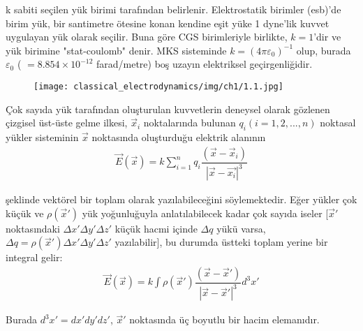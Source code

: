 k sabiti seçilen yük birimi tarafından belirlenir. Elektrostatik birimler (esb)'de birim yük, bir santimetre ötesine konan kendine eşit yüke 1 dyne'lik kuvvet uygulayan yük olarak seçilir. Buna göre CGS birimleriyle birlikte, $k = 1$'dir ve yük birimine "stat-coulomb" denir. MKS sisteminde $k = (4 \pi \varepsilon_{0})^{-1}$ olup, burada $\varepsilon_{0} $ ( $= 8.854 \times 10^{-12}$ farad/metre) boş uzayın elektriksel geçirgenliğidir. 
\begin{figure}[h!]
    \centering
    \texttt{[image: classical\_electrodynamics/img/ch1/1.1.jpg]}
    \caption{}
\end{figure}

\newpage

Çok sayıda yük tarafından oluşturulan kuvvetlerin deneysel olarak gözlenen çizgisel üst-üste gelme ilkesi, $\Vec{x}_{i}$ noktalarında bulunan $q_{i} (i=1,2,...,n)$ noktasal yükler sisteminin $\Vec{x}$ noktasında oluşturduğu elektrik alanının
\begin{align}
    \Vec{E} (\Vec{x}) = k \sum_{i = 1}^{n} q_{i} \dfrac{( \Vec{x} - \Vec{x}_{i})}{| \Vec{x} - \Vec{x_{i}}|^{3}}
\end{align}

şeklinde vektörel bir toplam olarak yazılabileceğini söylemektedir. Eğer yükler çok küçük ve $\rho (\Vec{x}')$ yük yoğunluğuyla anlatılabilecek kadar çok sayıda iseler [$\Vec{x}'$ noktasındaki $\Delta x' \Delta y' \Delta z'$ küçük hacmi içinde $\Delta q$ yükü varsa, $\Delta q = \rho(\Vec{x}') \Delta x' \Delta y' \Delta z'$ yazılabilir], bu durumda üstteki toplam yerine bir integral gelir:
\begin{align}
   \Vec{E} (\Vec{x}) = k \int \rho(\Vec{x}') \dfrac{( \Vec{x} - \Vec{x}')}{| \Vec{x} - \Vec{x}'|^{3}} d^{3} x' 
\end{align}

Burada $d^{3} x' = dx' dy' dz'$, $\Vec{x}'$ noktasında üç boyutlu bir hacim elemanıdır.


